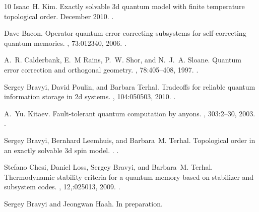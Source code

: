 \documentclass[letterpaper,10pt,pra,aps,showpacs,twocolumn]{revtex4-1}
\theoremstyle{definition} \newtheorem{defn}{Definition}
\theoremstyle{definition} \newtheorem{remark}{Remark}
\begin{document}
\begin{thebibliography}{10}
Isaac~H. Kim.
\newblock Exactly solvable 3d quantum model with finite temperature topological
  order.
\newblock December 2010.
\newblock \href {http://arxiv.org/abs/1012.0859} {}.

Dave Bacon.
\newblock Operator quantum error correcting subsystems for self-correcting
  quantum memories.
, 73:012340, 2006.
\newblock \href {http://arxiv.org/abs/quant-ph/0506023}
  {}.

A.~R. Calderbank, E.~M Rains, P.~W. Shor, and N.~J.~A. Sloane.
\newblock Quantum error correction and orthogonal geometry.
, 78:405--408, 1997.
\newblock \href {http://arxiv.org/abs/quant-ph/9605005}
  {}.

Sergey Bravyi, David Poulin, and Barbara Terhal.
\newblock Tradeoffs for reliable quantum information storage in 2d systems.
, 104:050503, 2010.
\newblock \href {http://arxiv.org/abs/0909.5200} {}.

A.~Yu. Kitaev.
\newblock Fault-tolerant quantum computation by anyons.
, 303:2--30, 2003.
\newblock \href {http://arxiv.org/abs/quant-ph/9707021}
  {}.

Sergey Bravyi, Bernhard Leemhuis, and Barbara~M. Terhal.
\newblock Topological order in an exactly solvable 3d spin model.
.
\newblock \href {http://arxiv.org/abs/1006.4871} {}.

Stefano Chesi, Daniel Loss, Sergey Bravyi, and Barbara~M. Terhal.
\newblock Thermodynamic stability criteria for a quantum memory based on
  stabilizer and subsystem codes.
, 12,:025013, 2009.
\newblock \href {http://arxiv.org/abs/0907.2807} {}.

Sergey Bravyi and Jeongwan Haah.
\newblock In preparation.

\end{thebibliography}
\end{document}
